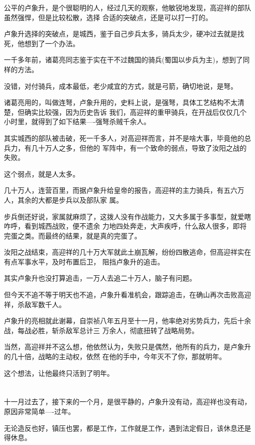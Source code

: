 \documentclass[11pt,a4paper,onecolumn]{article}
\begin{document}
公平的卢象升，是个很聪明的人，经过几天的观察，他敏锐地发现，高迎祥的部队虽然强悍，但是比较松散，选择
合适的突破点，还是可以打一打的。

卢象升选择的突破点，是城西，鉴于自己步兵太多，骑兵太少，硬冲过去就是找死，他想到了一个办法。

一千多年前，诸葛亮同志鉴于实在干不过魏国的骑兵(蜀国以步兵为主)，想到了同样的方法。

没错，对付骑兵，成本最低，老少咸宜的方式，就是弓箭，确切地说，是弩。

诸葛亮用的，叫做连弩，卢象升用的，史料上说，是强弩，具体工艺结构不太清楚，但确实比较强，因为历史告诉
我们，高迎祥的重甲骑兵，在开战后仅仅几个小时里，就得到了如下结果----强弩杀贼千余人。

其实城西的部队被击破，死一千多人，对高迎祥而言，并不是啥大事，毕竟他的总兵力，有几十万人之多，但他的
军阵中，有一个致命的弱点，导致了汝阳之战的失败。

这个弱点，就是人太多。

几十万人，连营百里，而据卢象升给皇帝的报告，高迎祥的主力骑兵，有五六万人，其余的大都是步兵以及部队家
属。

步兵倒还好说，家属就麻烦了，这拨人没有作战能力，又大多属于多事型，就爱瞎咋呼，看到城西战败，便不遗余
力地四处奔走，大声疾呼，什么敌人很多，即将完蛋之类。而最终的结果，就是真的完蛋了。

汝阳之战结束，高迎祥的几十万大军就此土崩瓦解，纷纷四散逃命，但高迎祥实在有点军事水平，及时布置后卫，
阻挡卢象升的追击。

其实卢象升也没打算追击，一万人去追二十万人，脑子有问题。

但今天不追不等于明天也不追，卢象升看准机会，跟踪追击，在确山再次击败高迎祥，杀敌军数千人。

卢象升的亮相就此谢幕，自崇祯八年五月至十一月，他率绝对劣势兵力，先后十余战，每战必胜，斩杀敌军总计三
万余人，彻底扭转了战略局势。

当然，高迎祥并不这么想，他依然认为，失败只是偶然，他所有的兵力，是卢象升的几十倍，战略的主动权，依然
在他的手中，今年灭不了你，那就明年。

这个想法，让他最终只活到了明年。

\section[\thesection]{}

十一月过去了，接下来的一个月，是很平静的，卢象升没有动，高迎祥也没有动，原因非常简单----过年。

无论造反也好，镇压也罢，都是工作，工作就是工作，遇到法定假日，该休息还是得休息。
\end{document}

